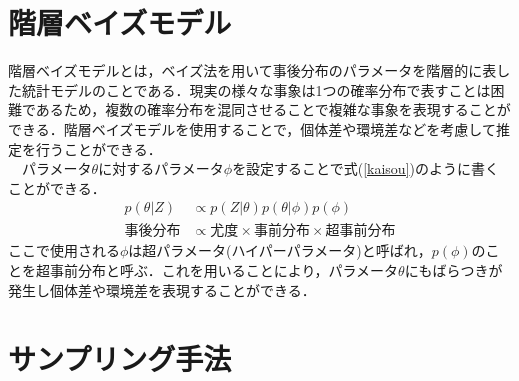 \documentclass[11pt, a4paper]{jarticle}
\begin{document}
\section{階層ベイズモデル}
階層ベイズモデルとは，ベイズ法を用いて事後分布のパラメータを階層的に表した統計モデルのことである．現実の様々な事象は1つの確率分布で表すことは困難であるため，複数の確率分布を混同させることで複雑な事象を表現することができる．階層ベイズモデルを使用することで，個体差や環境差などを考慮して推定を行うことができる．\\
　パラメータ$\theta$に対するパラメータ$\phi$を設定することで式(\ref{kaisou})のように書くことができる．
\begin{equation} \label{kaisou}
\begin{split}
	p(\theta|Z) &\propto p(Z|\theta)p(\theta|\phi)p(\phi) \\
	事後分布 &\propto 尤度 \times 事前分布 \times 超事前分布
\end{split}
\end{equation}
ここで使用される$\phi$は超パラメータ(ハイパーパラメータ)と呼ばれ，$p(\phi)$のことを超事前分布と呼ぶ．これを用いることにより，パラメータ$\theta$にもばらつきが発生し個体差や環境差を表現することができる．

\section{サンプリング手法}
\end{document}

